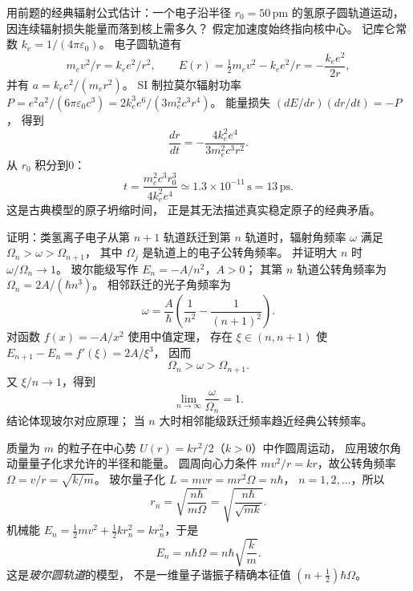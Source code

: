 用前题的经典辐射公式估计：一个电子沿半径
$r_0=50\,\mathrm{pm}$ 的氢原子圆轨道运动，
因连续辐射损失能量而落到核上需多久？
假定加速度始终指向核中心。
\exsolution
记库仑常数 $k_e=1/(4\pi\varepsilon_0)$。
电子圆轨道有
\[
 m_ev^2/r=k_ee^2/r^2,\qquad
 E(r)=\tfrac12m_ev^2-k_ee^2/r
 =-\frac{k_ee^2}{2r},
\]
并有 $a=k_ee^2/(m_er^2)$。
SI 制拉莫尔辐射功率
$P=e^2a^2/(6\pi\varepsilon_0c^3)
=2k_e^3e^6/(3m_e^2c^3r^4)$。
能量损失
$(dE/dr)(dr/dt)=-P$，
得到
\[
 \frac{dr}{dt}=-\frac{4k_e^2e^4}{3m_e^2c^3r^2}.
\]
从 $r_0$ 积分到0：
\[
 \boxed{t=\frac{m_e^2c^3r_0^3}{4k_e^2e^4}
 \simeq1.3\times10^{-11}\,\mathrm s=13\,\mathrm{ps}}.
\]
\excheck 这是古典模型的原子坍缩时间，
正是其无法描述真实稳定原子的经典矛盾。

证明：类氢离子电子从第 $n+1$ 轨道跃迁到第
$n$ 轨道时，辐射角频率 $\omega$
满足 $\Omega_n>\omega>\Omega_{n+1}$，
其中 $\Omega_j$ 是轨道上的电子公转角频率。
并证明大 $n$ 时 $\omega/\Omega_n\to1$。
\exsolution
玻尔能级写作 $E_n=-A/n^2$，$A>0$；
其第 $n$ 轨道公转角频率为
$\Omega_n=2A/(\hbar n^3)$。
相邻跃迁的光子角频率为
\[
 \omega=\frac{A}{\hbar}
 \left(\frac1{n^2}-\frac1{(n+1)^2}\right).
\]
对函数 $f(x)=-A/x^2$ 使用中值定理，
存在 $\xi\in(n,n+1)$ 使
$E_{n+1}-E_n=f'(\xi)=2A/\xi^3$，
因而
\[
 \boxed{\Omega_n>\omega>\Omega_{n+1}}.
\]
又 $\xi/n\to1$，得到
\[
 \boxed{\lim_{n\to\infty}
 \frac\omega{\Omega_n}=1}.
\]
\excheck 结论体现玻尔对应原理；
当 $n$ 大时相邻能级跃迁频率趋近经典公转频率。

质量为 $m$ 的粒子在中心势
$U(r)=kr^2/2$（$k>0$）中作圆周运动，
应用玻尔角动量量子化求允许的半径和能量。
\exsolution
圆周向心力条件
$mv^2/r=kr$，故公转角频率
$\Omega=v/r=\sqrt{k/m}$。
玻尔量子化
$L=mvr=mr^2\Omega=n\hbar$，
$n=1,2,\dots$，所以
\[
 \boxed{r_n=\sqrt{\frac{n\hbar}{m\Omega}}
 =\sqrt{\frac{n\hbar}{\sqrt{mk}}}}.
\]
机械能
$E_n=\tfrac12mv^2+\tfrac12kr_n^2
=kr_n^2$，于是
\[
 \boxed{E_n=n\hbar\Omega=
 n\hbar\sqrt{\frac km}}.
\]
\excheck 这是\emph{玻尔圆轨道}的模型，
不是一维量子谐振子精确本征值
$(n+\tfrac12)\hbar\Omega$。

